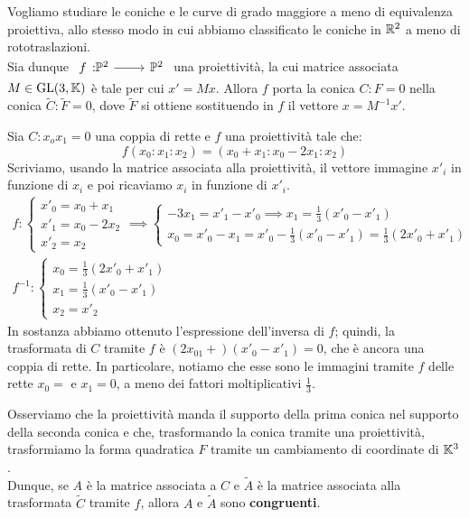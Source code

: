 Vogliamo studiare le coniche e le curve di grado maggiore a meno di equivalenza proiettiva, allo stesso modo in cui abbiamo classificato le coniche in $\mathbb{R}^2$ a meno di rototraslazioni.\\
Sia dunque $\funz f {\proj[2]{\ }} {\proj[2]{\ }}$ una proiettività, la cui matrice associata $M\in\operatorname{GL}(3,\mathbb{K})$ è tale per cui $x'=Mx$. Allora $f$ porta la conica $C\colon F=0$ nella conica $\widetilde{C}\colon \widetilde{F}=0$, dove $\widetilde{F}$ si ottiene sostituendo in $f$ il vettore $x=M^{-1}x'$.
\begin{example}
Sia $C \colon x_ox_1=0$ una coppia di rette e $f$ una proiettività tale che:
\begin{equation*}
	f(x_0\colon x_1\colon x_2)=(x_0+x_1\colon x_0-2x_1\colon x_2)
\end{equation*}
Scriviamo, usando la matrice associata alla proiettività, il vettore immagine $x'_i$ in funzione di $x_i$ e poi ricaviamo $x_i$ in funzione di $x'_i$.
\begin{gather*}
f\colon \begin{cases} 
x'_0=x_0+x_1\\
x'_1=x_0-2x_2\\
x'_2=x_2
\end{cases} \implies \begin{cases}
-3x_1=x'_1-x'_0 \implies x_1=\frac{1}{3}(x'_0-x'_1)\\
x_0=x'_0-x_1=x'_0 -\frac{1}{3}(x'_0-x'_1)=\frac{1}{3}(2x'_0+x'_1)
\end{cases}\\
f^{-1}\colon \begin{cases}
x_0=\frac{1}{3}(2x'_0+x'_1)\\
x_1=\frac{1}{3}(x'_0-x'_1)\\
x_2=x'_2
\end{cases}
\end{gather*}
In sostanza abbiamo ottenuto l'espressione dell'inversa di $f$; quindi, la trasformata di $C$ tramite $f$ è $(2x_01+)(x'_0-x'_1)=0$, che è ancora una coppia di rette. In particolare, notiamo che esse sono le immagini tramite $f$ delle rette $x_0=$ e $x_1=0$, a meno dei fattori moltiplicativi $\frac{1}{3}$.
\end{example}
Osserviamo che la proiettività manda il supporto della prima conica nel supporto della seconda conica e che, trasformando la conica tramite una proiettività, trasformiamo la forma quadratica $F$ tramite un cambiamento di coordinate di $\mathbb{K}^3$.\\
Dunque, se $A$ è la matrice associata a $C$ e $\widetilde{A}$ è la matrice associata alla trasformata $\widetilde{C}$ tramite $f$, allora $A$ e $\widetilde{A}$ sono \textbf{congruenti}.
